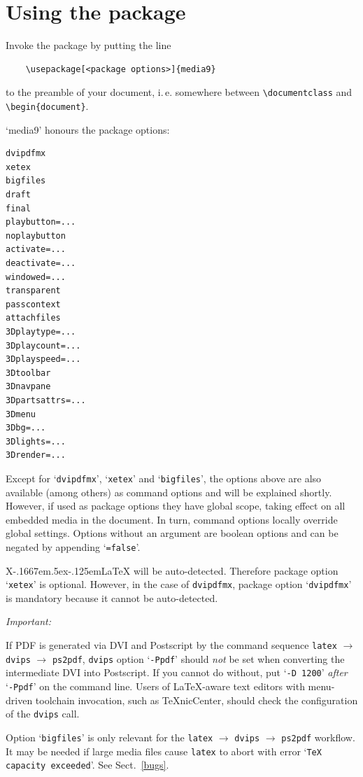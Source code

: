 \documentclass[a4paper]{article}
\def\XeLaTeX{X\kern-.1667em\lower.5ex\hbox{\reflectbox{E}}\kern-.125em\LaTeX}
\begin{document}
\section{Using the package}\label{pkguse}
Invoke the package by putting the line
\begin{verbatim}
    \usepackage[<package options>]{media9}
\end{verbatim}
to the preamble of your document, i.\,e. somewhere between \verb+\documentclass+ and \verb+\begin{document}+.

`media9' honours the package options:
\begin{verbatim}
dvipdfmx
xetex
bigfiles
draft
final
playbutton=...
noplaybutton
activate=...
deactivate=...
windowed=...
transparent
passcontext
attachfiles
3Dplaytype=...
3Dplaycount=...
3Dplayspeed=...
3Dtoolbar
3Dnavpane
3Dpartsattrs=...
3Dmenu
3Dbg=...
3Dlights=...
3Drender=...
\end{verbatim}
Except for `\verb+dvipdfmx+', `\verb+xetex+' and `\verb+bigfiles+', the options above are also available (among others) as command options and will be explained shortly. However, if used as package options they have global scope, taking effect on all embedded media in the document. In turn, command options locally override global settings. Options without an argument are boolean options and can be negated by appending `\verb+=false+'.

\XeLaTeX{} will be auto-detected. Therefore package option `\verb+xetex+' is optional. However, in the case of  \verb+dvipdfmx+, package option `\verb+dvipdfmx+' is mandatory because it cannot be auto-detected.

\begin{animateinline}{1}\strut\emph{Important:}\newframe[3]\end{animateinline} If PDF is generated via DVI and Postscript by the command sequence \verb+latex+ $\rightarrow$ \verb+dvips+ $\rightarrow$ \verb+ps2pdf+, \verb+dvips+ option `\verb+-Ppdf+' should \emph{not} be set when converting the intermediate DVI into Postscript. If you cannot do without, put `\verb+-D 1200+' \emph{after} `\verb+-Ppdf+' on the command line. Users of \LaTeX-aware text editors with menu-driven toolchain invocation, such as \TeX{}nicCenter, should check the configuration of the \verb+dvips+ call.

Option `\verb+bigfiles+' is only relevant for the \verb+latex+ $\rightarrow$ \verb+dvips+ $\rightarrow$ \verb+ps2pdf+ workflow. It may be needed if large media files cause \verb+latex+ to abort with error `\verb+TeX capacity exceeded+'. See Sect.\ \ref{bugs}.
\end{document}
